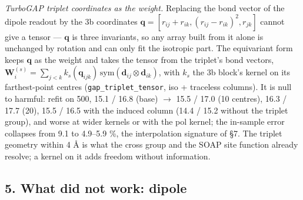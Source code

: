 \documentclass[
  10pt,
]{article}
\begin{document}
\emph{TurboGAP triplet coordinates as the weight.} Replacing the bond vector of the dipole readout
by the 3b coordinates \(\mathbf q=[r_{ij}+r_{ik},(r_{ij}-r_{ik})^2,r_{jk}]\) cannot give a tensor
--- \(\mathbf q\) is three invariants, so any array built from it alone is unchanged by rotation and
can only fit the isotropic part. The equivariant form keeps \(\mathbf q\) as the weight and takes
the tensor from the triplet's bond vectors,
\(\mathbf W^{(s)}_i=\sum_{j<k}k_s(\mathbf q_{ijk})\,\mathrm{sym}(\mathbf d_{ij}\otimes\mathbf d_{ik})\),
with \(k_s\) the 3b block's kernel on its farthest-point centres (\texttt{gap\_triplet\_tensor}, iso
+ traceless columns). It is null to harmful: refit on 500, 15.1 / 16.8 (base) \(\rightarrow\) 15.5 /
17.0 (10 centres), 16.3 / 17.7 (20), 15.5 / 16.5 with the induced column (14.4 / 15.2 without the
triplet group), and worse at wider kernels or with the pol kernel; the in-sample error collapses
from 9.1 to 4.9--5.9 \%, the interpolation signature of §7. The triplet geometry within 4 \AA{} is
what the cross group and the SOAP site function already resolve; a kernel on it adds freedom without
information.

\subsection{5. What did not work: dipole}\label{what-did-not-work-dipole}
\end{document}
